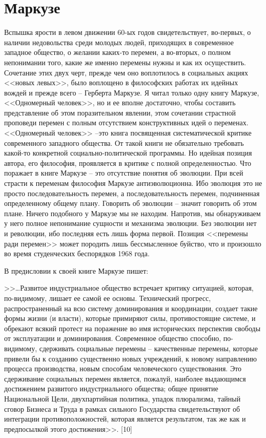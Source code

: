 \documentclass{book}
\begin{document}
\section{Маркузе}

Вспышка ярости в левом движении 60-ых годов свидетель­ствует, во-первых, о наличии недовольства среди молодых лю­дей, приходящих в современное западное общество, о жела­нии каких-то перемен, а во-вторых, о полном непонимании то­го, какие же именно перемены нужны и как их осуществить. Сочетание этих двух черт, прежде чем оно воплотилось в социальных акциях <<новых левых>>, было воплощено в философских работах их идейных вождей и прежде всего -- Герберта Маркузе. Я читал только одну книгу Маркузе, <<Одномерный человек>>, но и ее вполне достаточно, чтобы составить представление об этом поразительном явлении, этом сочетании страстной проповеди перемен с полным отсутствием конструктивных идей о переменах. <<Одномерный человек>> --это книга посвященная систематической критике современного западного общества. От такой книги не обязательно требовать какой-то конкретной социально-политической программы. Но идейная позиция автора, его философия, проявляется в критике с полной определенностью.
Что поражает в книге Маркузе -- это отсутствие понятия об эволюции.  При всей страсти к переменам философия Маркузе антиэволюционна. Ибо эволюция это не просто последовательность перемен, а последовательность перемен, подчиненная определенному общему плану. Говорить об эволюции -- значит говорить об этом плане. Ничего подобного у Маркузе мы не находим. Напротив, мы обнаруживаем у него полное непонимание сущности и механизма эволюции. Без эволюции нет и революции, ибо последняя есть лишь форма первой. Позиция <<перемены ради перемен>> может породить лишь бессмысленное буйство, что и произошло во время студенческих беспо­рядков 1968 года.

В предисловии к своей книге Маркузе пишет:

>>\ldots Развитое индустриальное общество встречает критику ситуацией, которая, по-видимому, лишает ее самой ее основы. Технический прогресс, распространенный на всю систему доминирования и координации, создает такие формы жизни (и власти), которые примиряют силы, противостоящие системе, и обрекают всякий протест на поражение во имя исторических перспектив свободы от эксплуатации и доминирования. Современное общество способно, по-видимому, сдерживать социальные перемены -- качественные перемены, которые привели бы к созданию существенно новых учреждений, к новому направлению процесса производства, новым способам человеческого существования. Это сдерживание социальных перемен являет­ся, пожалуй, наиболее выдающимся достижением развитого индустриального общества; общее принятие Национальной Цели, двухпартийная политика, упадок плюрализма, тайный сговор Бизнеса и Труда в рамках сильного Государства сви­детельствуют об интеграции противоположностей, которая яв­ляется результатом, так же как и предпосылкой этого 
дости­жения>>. [10]
\end{document}
